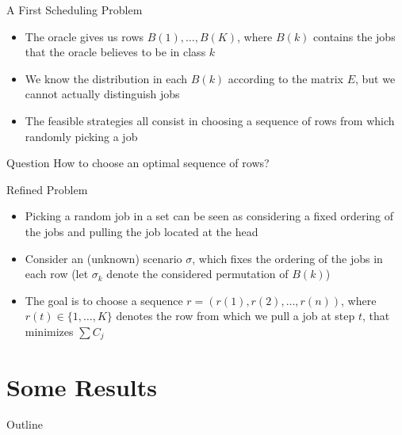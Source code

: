 \documentclass[aspectratio=169]{beamer}
\begin{document}
\begin{frame}{A First Scheduling Problem}

\begin{itemize}
    \item The oracle gives us rows \(B(1),\ldots,B(K)\), where \(B(k)\) contains the jobs that the oracle believes to be in class \(k\)
    \item We know the distribution in each \(B(k)\) according to the matrix \(E\), but we cannot actually distinguish jobs
    \item The feasible strategies all consist in choosing a sequence of rows from which randomly picking a job
\end{itemize}

\vspace{20pt}

\begin{block}{Question}
    How to choose an optimal sequence of rows?
\end{block}

\end{frame}


\begin{frame}{Refined Problem}
    \begin{itemize}
        \item Picking a random job in a set can be seen as considering a fixed ordering of the jobs and pulling the job located at the head
        \item Consider an (unknown) scenario \(\sigma\), which fixes the ordering of the jobs in each row (let \(\sigma_k\) denote the considered permutation of \(B(k)\))
        \item The goal is to choose a sequence \(r=(r(1),r(2),\ldots,r(n))\), where \(r(t)\in\{1,\ldots,K\}\) denotes the row from which we pull a job at step \(t\), that minimizes \(\sum C_j\)
    \end{itemize}
\end{frame}


\section{Some Results}

\begin{frame}{Outline}
\end{frame}
\end{document}
